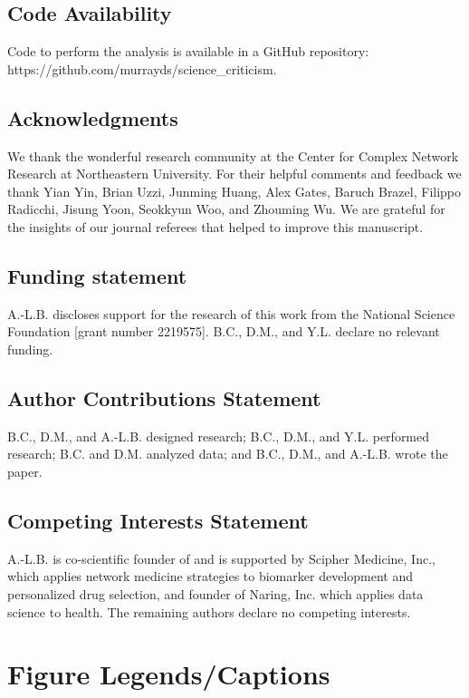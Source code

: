 \documentclass[12pt,a4paper]{article}
\numberwithin{equation}{section}
\begin{document}
\subsection*{Code Availability }
Code to perform the analysis is available in a GitHub repository: https://github.com/murrayds/science\_criticism.


\clearpage
\printbibliography

\subsection*{Acknowledgments}
We thank the wonderful research community at the Center for Complex Network Research at Northeastern University.
For their helpful comments and feedback we thank Yian Yin, Brian Uzzi, Junming Huang, Alex Gates, Baruch Brazel, Filippo Radicchi, Jisung Yoon, Seokkyun Woo, and Zhouming Wu.
We are grateful for the insights of our journal referees that helped to improve this manuscript.

\subsection*{Funding statement}
A.-L.B. discloses support for the research of this work from the National Science Foundation [grant number 2219575]. B.C., D.M., and Y.L. declare no relevant funding.

\subsection*{Author Contributions Statement}
B.C., D.M., and A.-L.B. designed research;
B.C., D.M., and Y.L. performed research; 
B.C. and D.M. analyzed data; 
and B.C., D.M., and A.-L.B. wrote the paper.

\subsection*{Competing Interests Statement}
A.-L.B. is co-scientific founder of and is supported by Scipher Medicine, Inc., which applies network medicine strategies to biomarker development and personalized drug selection, and founder of Naring, Inc. which applies data science to health. The remaining authors declare no competing interests.

\clearpage
\section*{Figure Legends/Captions}
\end{document}
